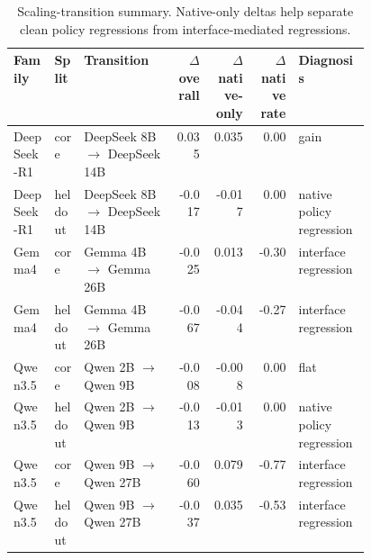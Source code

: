 \begin{table}[t]
  \centering
  \scriptsize
  \setlength{\tabcolsep}{4pt}
  \begin{tabular}{llp{0.26\linewidth}rrrp{0.20\linewidth}}
    \toprule
    Family & Split & Transition & $\Delta$ overall & $\Delta$ native-only & $\Delta$ native rate & Diagnosis \\
    \midrule
    DeepSeek-R1 & core & DeepSeek 8B $\rightarrow$ DeepSeek 14B & 0.035 & 0.035 & 0.00 & gain \\
    DeepSeek-R1 & heldout & DeepSeek 8B $\rightarrow$ DeepSeek 14B & -0.017 & -0.017 & 0.00 & native policy regression \\
    Gemma4 & core & Gemma 4B $\rightarrow$ Gemma 26B & -0.025 & 0.013 & -0.30 & interface regression \\
    Gemma4 & heldout & Gemma 4B $\rightarrow$ Gemma 26B & -0.067 & -0.044 & -0.27 & interface regression \\
    Qwen3.5 & core & Qwen 2B $\rightarrow$ Qwen 9B & -0.008 & -0.008 & 0.00 & flat \\
    Qwen3.5 & heldout & Qwen 2B $\rightarrow$ Qwen 9B & -0.013 & -0.013 & 0.00 & native policy regression \\
    Qwen3.5 & core & Qwen 9B $\rightarrow$ Qwen 27B & -0.060 & 0.079 & -0.77 & interface regression \\
    Qwen3.5 & heldout & Qwen 9B $\rightarrow$ Qwen 27B & -0.037 & 0.035 & -0.53 & interface regression \\
    \bottomrule
  \end{tabular}
  \caption{Scaling-transition summary. Native-only deltas help separate clean policy regressions from interface-mediated regressions.}
  \label{tab:scalingtransitions}
\end{table}
